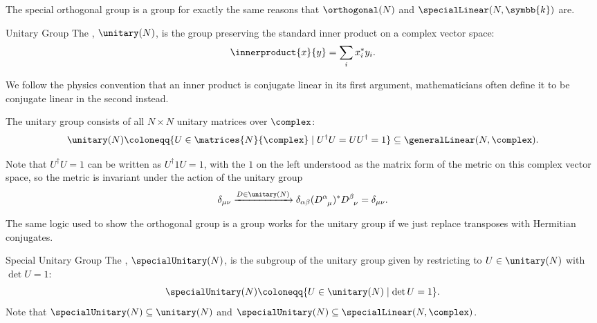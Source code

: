 \documentclass[fleqn]{NotesClass}
\newcommand{\subgroup}{\subseteq}
\newcommand{\ident}{1}
\newcommand{\hermit}{\dagger}
\renewcommand{\field}{\symbb{k}}
\begin{document}
    The special orthogonal group is a group for exactly the same reasons that \(\orthogonal(N)\) and \(\specialLinear(N, \field)\) are.
    
    \begin{dfn}{Unitary Group}{}
        The , \(\unitary(N)\), is the group preserving the standard inner product on a complex vector space:
        \begin{equation}
            \innerproduct{x}{y} = \sum_i x_i^* y_i.
        \end{equation}
        \begin{wrn}
            We follow the physics convention that an inner product is conjugate linear in its first argument, mathematicians often define it to be conjugate linear in the second instead.
        \end{wrn}
        The unitary group consists of all \(N \times N\) unitary matrices over \(\complex\):
        \begin{equation}
            \unitary(N) \coloneqq \{U \in \matrices{N}{\complex} \mid U^\hermit U = UU^\hermit = \ident\} \subgroup \generalLinear(N, \complex).
        \end{equation}
    \end{dfn}
    
    Note that \(U^\hermit U = \ident\) can be written as \(U^\hermit \ident U = \ident\), with the \(\ident\) on the left understood as the matrix form of the metric on this complex vector space, so the metric is invariant under the action of the unitary group
    \begin{equation}
        \delta_{\mu\nu} \xrightarrow{D \in \unitary(N)} \delta_{\alpha\beta} (\tensor{D}{^\alpha_\mu})^* \tensor{D}{^\beta_\nu} = \delta_{\mu\nu}.
    \end{equation}
    
    The same logic used to show the orthogonal group is a group works for the unitary group if we just replace transposes with Hermitian conjugates.
    
    \begin{dfn}{Special Unitary Group}{}
        The , \(\specialUnitary(N)\), is the subgroup of the unitary group given by restricting to \(U \in \unitary(N)\) with \(\det U = 1\):
        \begin{equation}
            \specialUnitary(N) \coloneqq \{U \in \unitary(N) \mid \det U = 1\}.
        \end{equation}
        Note that \(\specialUnitary(N) \subgroup \unitary(N)\) and \(\specialUnitary(N) \subgroup \specialLinear(N, \complex)\).
    \end{dfn}
    
\end{document}
